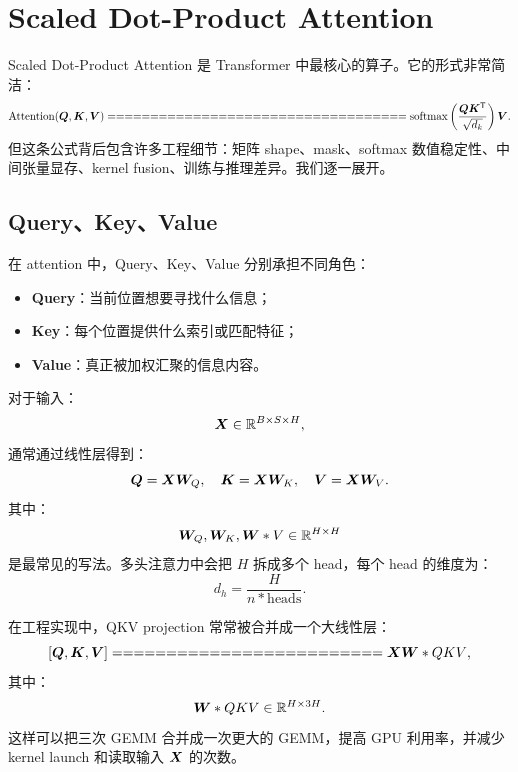 \section{Scaled Dot-Product Attention}
\label{sec:scaled-dot-product-attention}

Scaled Dot-Product Attention 是 Transformer 中最核心的算子。它的形式非常简洁：
\[
\Attention(\mat{Q},\mat{K},\mat{V})
===================================

\softmax
\left(
\frac{\mat{Q}\mat{K}^{\mathsf{T}}}{\sqrt{d_k}}
\right)
\mat{V}.
\]
但这条公式背后包含许多工程细节：矩阵 shape、mask、softmax 数值稳定性、中间张量显存、kernel fusion、训练与推理差异。我们逐一展开。

\subsection{Query、Key、Value}
\label{subsec:qkv}

在 attention 中，Query、Key、Value 分别承担不同角色：

\begin{itemize}
\item \textbf{Query}：当前位置想要寻找什么信息；
\item \textbf{Key}：每个位置提供什么索引或匹配特征；
\item \textbf{Value}：真正被加权汇聚的信息内容。
\end{itemize}

对于输入：
\[
\bm{X}\in\mathbb{R}^{B\times S\times H},
\]
通常通过线性层得到：
\[
\bm{Q}=\bm{X}\bm{W}_Q,
\quad
\bm{K}=\bm{X}\bm{W}_K,
\quad
\bm{V}=\bm{X}\bm{W}_V.
\]
其中：
\[
\bm{W}_Q,\bm{W}_K,\bm{W}*V\in\mathbb{R}^{H\times H}
\]
是最常见的写法。多头注意力中会把 $H$ 拆成多个 head，每个 head 的维度为：
\[
d_h=\frac{H}{n*{\mathrm{heads}}}.
\]

在工程实现中，QKV projection 常常被合并成一个大线性层：
\[
[\mat{Q},\mat{K},\mat{V}]
=========================

\mat{X}\mat{W}*{QKV},
\]
其中：
\[
\bm{W}*{QKV}\in\mathbb{R}^{H\times 3H}.
\]
这样可以把三次 GEMM 合并成一次更大的 GEMM，提高 GPU 利用率，并减少 kernel launch 和读取输入 $\bm{X}$ 的次数。

